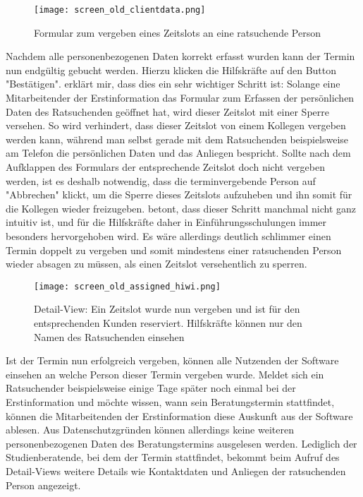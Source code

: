 \begin{figure}[h]
    \caption{Formular zum vergeben eines Zeitslots an eine ratsuchende Person}
    \centering
    \texttt{[image: screen\_old\_clientdata.png]}
\end{figure}

Nachdem alle personenbezogenen Daten korrekt erfasst wurden kann der Termin nun
endgültig gebucht werden. Hierzu klicken die Hilfskräfte auf den Button
"Bestätigen". \ipName erklärt mir, dass dies ein sehr wichtiger Schritt ist:
Solange eine Mitarbeitender der Erstinformation das Formular zum Erfassen der
persönlichen Daten des Ratsuchenden geöffnet hat, wird dieser Zeitslot mit
einer Sperre versehen. So wird verhindert, dass dieser Zeitslot von einem
Kollegen vergeben werden kann, während man selbst gerade mit dem Ratsuchenden
beispielsweise am Telefon die persönlichen Daten und das Anliegen bespricht.
Sollte nach dem Aufklappen des Formulars der entsprechende Zeitslot doch nicht
vergeben werden, ist es deshalb notwendig, dass die terminvergebende Person auf
"Abbrechen" klickt, um die Sperre dieses Zeitslots aufzuheben und ihn somit für
die Kollegen wieder freizugeben. \ipName betont, dass dieser Schritt manchmal
nicht ganz intuitiv ist, und für die Hilfskräfte daher in Einführungsschulungen
immer besonders hervorgehoben wird. Es wäre allerdings deutlich schlimmer einen
Termin doppelt zu vergeben und somit mindestens einer ratsuchenden Person
wieder absagen zu müssen, als einen Zeitslot versehentlich zu sperren.

\begin{figure}[h]
    \caption{Detail-View: Ein Zeitslot wurde nun vergeben und ist für den entsprechenden Kunden reserviert. Hilfskräfte können nur den Namen des Ratsuchenden einsehen}
    \centering
    \texttt{[image: screen\_old\_assigned\_hiwi.png]}
\end{figure}

Ist der Termin nun erfolgreich vergeben, können alle Nutzenden der Software
einsehen an welche Person dieser Termin vergeben wurde. Meldet sich ein
Ratsuchender beispielsweise einige Tage später noch einmal bei der
Erstinformation und möchte wissen, wann sein Beratungstermin stattfindet,
können die Mitarbeitenden der Erstinformation diese Auskunft aus der Software
ablesen. Aus Datenschutzgründen können allerdings keine weiteren
personenbezogenen Daten des Beratungstermins ausgelesen werden. Lediglich der
Studienberatende, bei dem der Termin stattfindet, bekommt beim Aufruf des
Detail-Views weitere Details wie Kontaktdaten und Anliegen der ratsuchenden
Person angezeigt.

